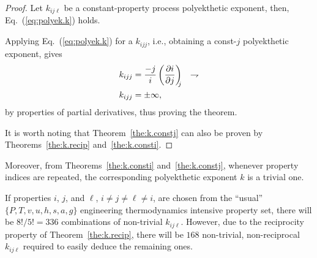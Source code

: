     \begin{proof}
        Let  $k_{ij\ell}$  be  a  constant-property   process   polyekthetic   exponent,   then,
        Eq.~(\ref{eq:polyek.k}) holds.

        Applying  Eq.~(\ref{eq:polyek.k})  for  a  $k_{ijj}$,  i.e.,   obtaining   a   const-$j$
        polyekthetic exponent, gives
        \begin{align}
            k_{ijj} &= \frac{-j}{i} \left(\frac{\partial {{i}}}{\partial {{j}}}\right)_{\!\!\!{j}}
                    & \rightharpoondown\\
            k_{ijj} &= \pm\infty,
        \end{align}
        \noindent by properties of partial derivatives, thus proving the theorem.

        It  is  worth  noting  that   Theorem~\ref{the:k.constj}   can   also   be   proven   by
        Theorems~\ref{the:k.recip} and~\ref{the:k.consti}.
    \end{proof}

    Moreover, from Theorems~\ref{the:k.consti} and~\ref{the:k.constj}, whenever property indices
    are repeated, the corresponding polyekthetic exponent $k$ is a trivial one.

    If properties $i$, $j$, and $\ell$, $i \neq j  \neq  \ell  \neq  i$,  are  chosen  from  the
    ``usual'' $\{P, T, v, u, h, s, a, g\}$ engineering thermodynamics  intensive  property  set,
    there will be $8!/5! = 336$ combinations of non-trivial $k_{ij\ell}$. However,  due  to  the
    reciprocity  property  of  Theorem~\ref{the:k.recip},  there  will  be  $168$   non-trivial,
    non-reciprocal $k_{ij\ell}$ required to easily deduce the remaining ones.


